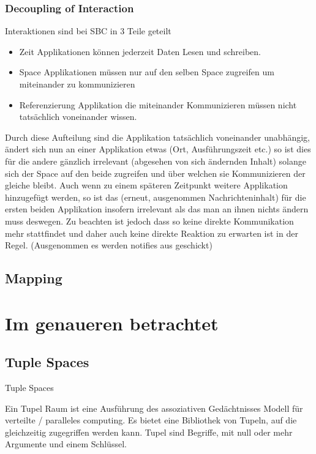 \documentclass[a4paper,12pt]{scrreprt}
\begin{document}
		\subsection{Decoupling of Interaction}
			Interaktionen sind bei SBC in 3 Teile geteilt 
			\begin{itemize}
				\item Zeit
					\subitem Applikationen können jederzeit Daten Lesen und schreiben.
				\item Space
					\subitem Applikationen müssen nur auf den selben Space zugreifen um miteinander zu kommunizieren
				\item Referenzierung
					\subitem Applikation die miteinander Kommunizieren müssen nicht tatsächlich voneinander wissen.
			\end{itemize}
			Durch diese Aufteilung sind die Applikation tatsächlich voneinander unabhängig, ändert sich nun an einer Applikation etwas (Ort, Ausführungszeit etc.) so ist dies für die andere gänzlich irrelevant (abgesehen von sich ändernden Inhalt) solange sich der Space auf den beide zugreifen und über welchen sie Kommunizieren der gleiche bleibt. Auch wenn zu einem späteren Zeitpunkt weitere Applikation hinzugefügt werden, so ist das (erneut, ausgenommen Nachrichteninhalt) für die ersten beiden Applikation insofern irrelevant als das man an ihnen nichts ändern muss deswegen. Zu beachten ist jedoch dass so keine direkte Kommunikation mehr stattfindet und daher auch keine direkte Reaktion zu erwarten ist in der Regel. (Ausgenommen es werden notifies aus geschickt)
			
			
		
	\section{Mapping}
		
	
\chapter{Im genaueren betrachtet}
	\section{Tuple Spaces}
		Tuple Spaces
		
		Ein Tupel Raum ist eine Ausführung des assoziativen Gedächtnisses Modell für verteilte / paralleles computing. Es bietet eine Bibliothek von Tupeln, auf  die gleichzeitig zugegriffen werden kann. Tupel sind Begriffe, mit null oder mehr Argumente und einem Schlüssel. %
		
\end{document}
